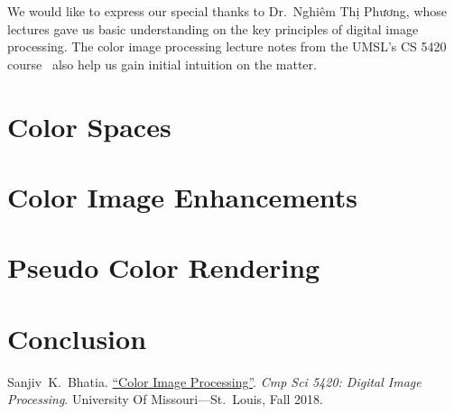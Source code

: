 \documentclass[a4paper,12pt]{article}
\begin{document}
We would like to express our special thanks to Dr.~Nghiêm Thị Phương,
whose lectures gave us basic understanding on the key principles of
digital image processing.  The color image processing lecture notes from
the UMSL's CS 5420 course~\cite{cs5420} also help us gain initial intuition
on the matter.

\newpage
{}
\section{Color Spaces}

\section{Color Image Enhancements}

\section{Pseudo Color Rendering}

\section{Conclusion}

\begin{thebibliography}{69}
   Sanjiv~K.~Bhatia.
    \href{http://www.cs.umsl.edu/~sanjiv/classes/cs5420/lectures/color.pdf}
         {``Color Image Processing''}.
    \emph{Cmp Sci 5420: Digital Image Processing}.
    University Of Missouri---St.~Louis, Fall 2018.
\end{thebibliography}
\end{document}
